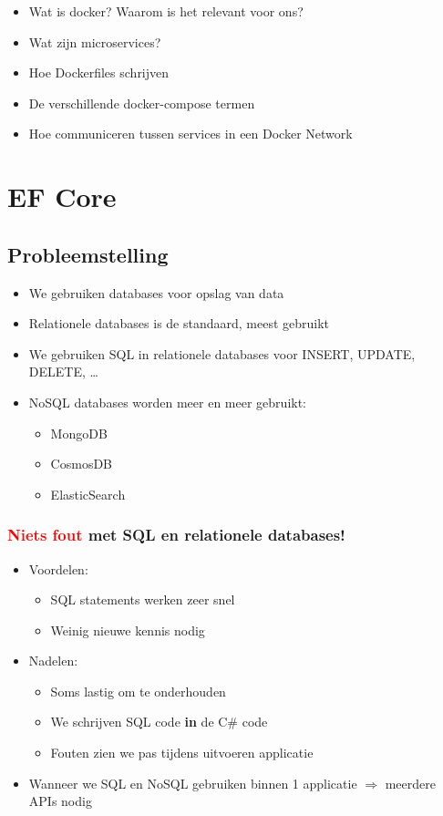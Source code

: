 \documentclass{article}
\begin{document}
\begin{itemize}
    \item Wat is docker? Waarom is het relevant voor ons?
    \item Wat zijn microservices?
    \item Hoe Dockerfiles schrijven
    \item De verschillende docker-compose termen
    \item Hoe communiceren tussen services in een Docker Network
\end{itemize}

\section{EF Core}

\subsection{Probleemstelling}

\begin{itemize}
    \item We gebruiken databases voor opslag van data
    \item Relationele databases is de standaard, meest gebruikt
    \item We gebruiken SQL in relationele databases voor INSERT, UPDATE, DELETE, \dots
    \item NoSQL databases worden meer en meer gebruikt:
    \begin{itemize}
        \item MongoDB
        \item CosmosDB
        \item ElasticSearch
    \end{itemize}
\end{itemize}

\subsubsection{\textcolor{red}{Niets fout} met SQL en relationele databases!}

\begin{itemize}
    \item Voordelen:
    \begin{itemize}
        \item SQL statements werken zeer snel
        \item Weinig nieuwe kennis nodig
    \end{itemize}
    \item Nadelen:
    \begin{itemize}
        \item Soms lastig om te onderhouden
        \item We schrijven SQL code \textbf{in} de C\# code
        \item Fouten zien we pas tijdens uitvoeren applicatie
    \end{itemize}
    \item Wanneer we SQL en NoSQL gebruiken binnen 1 applicatie $\Rightarrow$ meerdere APIs nodig
\end{itemize}
\end{document}
